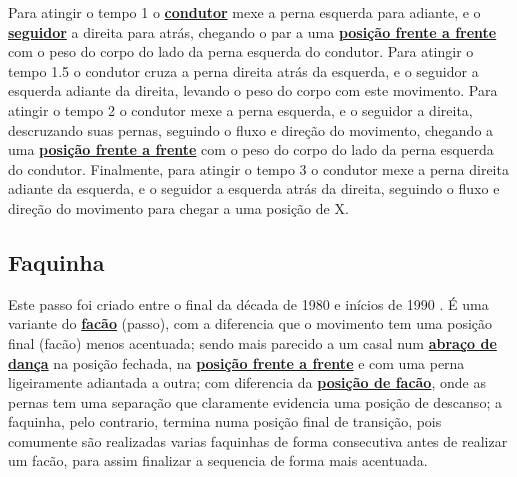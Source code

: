 Para atingir o tempo 1 o \hyperref[def:Condutor]{\textbf{condutor}} mexe a perna esquerda para adiante, 
e o \hyperref[def:Seguidor]{\textbf{seguidor}}  a direita para atrás,
chegando o par a uma \hyperref[def:frente-frente-position]{\textbf{posição frente a frente}}
com o peso do corpo do lado da perna esquerda do condutor.
Para atingir o tempo 1.5 o condutor cruza a perna direita atrás da esquerda,
e o seguidor a esquerda adiante da direita, levando o peso do corpo com este movimento.
Para atingir o tempo 2 o condutor mexe a perna esquerda, e o seguidor a direita,
descruzando suas pernas, seguindo o fluxo e direção do movimento,
chegando a uma \hyperref[def:frente-frente-position]{\textbf{posição frente a frente}}
com o peso do corpo do lado da perna esquerda do condutor.
Finalmente, para atingir o tempo 3 o condutor mexe a perna direita adiante da esquerda,
e o seguidor a esquerda atrás da direita, 
seguindo o fluxo e direção do movimento para chegar a uma posição de X. 

\subsection{Faquinha}

Este passo foi  criado entre o final da década de 1980 e inícios de 1990  \cite[pp. 143]{perna2002samba}.
É uma variante do  \hyperref[subsec:desc:passo:facao]{\textbf{facão}} (passo), 
com a diferencia que o movimento tem uma posição final (facão) menos acentuada;
sendo mais parecido a um casal num \hyperref[def:abracodedanca]{\textbf{abraço de dança}} na posição fechada, 
na \hyperref[def:frente-frente-position]{\textbf{posição frente a frente}}  e com uma perna ligeiramente adiantada a outra;
com diferencia da \hyperref[def:facao-position]{\textbf{posição de facão}}, 
onde as pernas tem uma separação que claramente evidencia uma posição de descanso;
a faquinha, pelo contrario, termina numa posição final de transição, 
pois comumente são realizadas varias faquinhas de forma consecutiva antes de realizar um facão,
 para assim finalizar a sequencia de forma mais acentuada.
 
